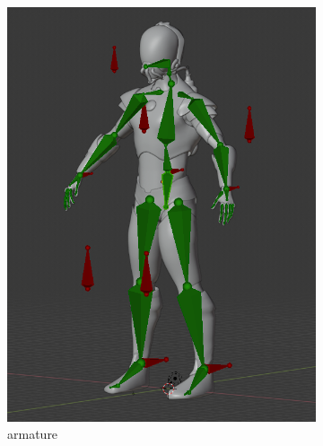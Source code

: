 \begin{figure}
\begin{subfigure}{.33\textwidth}
  \includegraphics[width=\linewidth]{Figures/rig1}
  \caption{armature}
  \label{fig:FK2}
\end{subfigure}%
\begin{subfigure}{.33\textwidth}
  \centering

\end{subfigure}
\end{figure}

